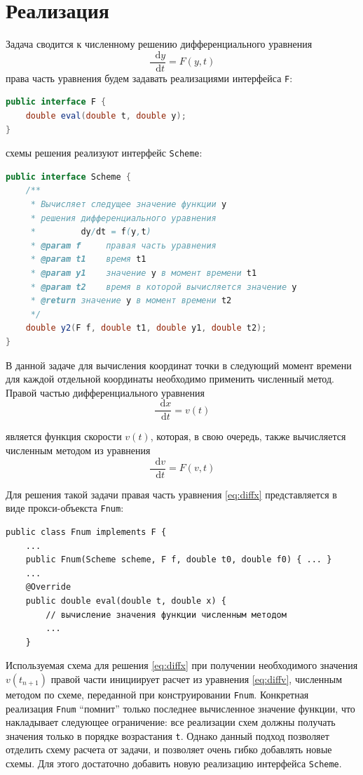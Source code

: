 \documentclass[a4paper, titlepage]{article}
\newcommand*\dd{\mathop{}\!\mathrm{d}}
\begin{document}
\section{Реализация}
Задача сводится к численному решению дифференциального уравнения
$$ \frac{\dd y}{\dd t} = F(y,t) $$
права часть уравнения будем задавать реализациями интерфейса \lstinline|F|:
\begin{lstlisting}[language=java]
public interface F {
    double eval(double t, double y);
}
\end{lstlisting}

схемы решения реализуют интерфейс \lstinline|Scheme|:
\begin{lstlisting}[language=java]
public interface Scheme {
    /**
     * Вычисляет следущее значение функции y
     * решения дифференциального уравнения
     *         dy/dt = f(y,t)
     * @param f     правая часть уравнения
     * @param t1    время t1
     * @param y1    значение y в момент времени t1
     * @param t2    время в которой вычисляется значение y
     * @return значение y в момент времени t2
     */
    double y2(F f, double t1, double y1, double t2);
}
\end{lstlisting}

В данной задаче для вычисления координат точки в следующий момент времени для каждой отдельной координаты необходимо применить численный метод. Правой частью дифференциального уравнения
\begin{equation}
 \label{eq:diffx}
 \frac{\dd x}{\dd t} = v(t)
\end{equation}

является функция скорости $v(t)$, которая, в свою очередь, также вычисляется численным методом из уравнения
\begin{equation}
 \label{eq:diffv}
 \frac{\dd v}{\dd t} = F(v,t)
\end{equation}


Для решения такой задачи правая часть уравнения \ref{eq:diffx} представляется в виде прокси-объекста \lstinline|Fnum|:
\begin{lstlisting}
public class Fnum implements F {
    ...
    public Fnum(Scheme scheme, F f, double t0, double f0) { ... }
    ...
    @Override
    public double eval(double t, double x) {
        // вычисление значения функции численным методом
        ...
    }
\end{lstlisting}
Используемая схема для решения \ref{eq:diffx} при получении необходимого значения $v(t_{n+1})$ правой части инициирует расчет из уравнения \ref{eq:diffv}, численным методом по схеме, переданной при конструировании \lstinline|Fnum|. Конкретная реализация \lstinline|Fnum| ``помнит'' только последнее вычисленное значение функции, что накладывает следующее ограничение: все реализации схем должны получать значения только в порядке возрастания \lstinline|t|. Однако данный подход позволяет отделить схему расчета от задачи, и позволяет очень гибко добавлять новые схемы. Для этого достаточно добавить новую реализацию интерфейса \lstinline|Scheme|.
\end{document}
